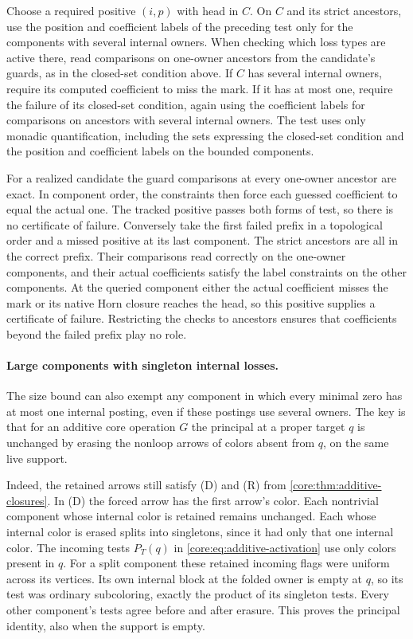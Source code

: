 Choose a required positive $(i,p)$ with head in $C$.
On $C$ and its strict ancestors, use the position and
coefficient labels of the preceding test only for the
components with several internal owners. When checking
which loss types are active there, read comparisons on
one-owner ancestors from the candidate's guards, as in
the closed-set condition above. If $C$ has several
internal owners, require its computed coefficient to
miss the mark. If it has at most one, require the
failure of its closed-set condition, again using the
coefficient labels for comparisons on ancestors with
several internal owners. The test uses only monadic
quantification, including the sets expressing the
closed-set condition and the position and coefficient
labels on the bounded components.

For a realized candidate the guard comparisons at every
one-owner ancestor are exact. In component order, the
constraints then force each guessed coefficient to
equal the actual one. The tracked positive passes both
forms of test, so there is no certificate of failure.
Conversely take the first failed prefix in a topological
order and a missed positive at its last component.
The strict ancestors are all in the correct prefix.
Their comparisons read correctly on the one-owner
components, and their actual coefficients satisfy the
label constraints on the other components. At the
queried component either the actual coefficient misses
the mark or its native Horn closure reaches the head,
so this positive supplies a certificate of failure.
Restricting the checks to ancestors ensures that
coefficients beyond the failed prefix play no role.

\paragraph{Large components with singleton internal losses.}
The size bound can also exempt any component in which every
minimal zero has at most one internal posting, even if these
postings use several owners. The key is that for an additive
core operation $G$ the principal at a proper target $q$ is
unchanged by erasing the nonloop arrows of colors absent from
$q$, on the same live support.

Indeed, the retained arrows still satisfy (D) and (R) from
\cref{core:thm:additive-closures}. In (D) the forced arrow
has the first arrow's color. Each nontrivial component whose
internal color is retained remains unchanged. Each whose
internal color is erased splits into singletons, since it had
only that one internal color. The incoming tests $P_T(q)$
in \eqref{core:eq:additive-activation} use only colors present
in $q$. For a split component these retained incoming flags
were uniform across its vertices. Its own internal block at
the folded owner is empty at $q$, so its test was ordinary
subcoloring, exactly the product of its singleton tests.
Every other component's tests agree before and after erasure.
This proves the principal identity, also when the support is
empty.

